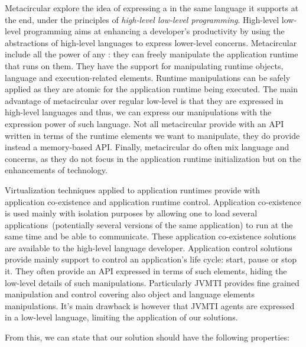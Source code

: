 Metacircular \VMs explore the idea of expressing a \VM in the same language it supports at the end, under the principles of \emph{high-level low-level programming}. High-level low-level programming aims at enhancing a developer's productivity by using the abstractions of high-level languages to express lower-level concerns. Metacircular \VMs include all the power of any \VM: they can freely manipulate the application runtime that runs on them. They have the support for manipulating runtime objects, language and execution-related elements. Runtime manipulations can be safely applied as they are atomic for the application runtime being executed. The main advantage of metacircular \VMs over regular low-level \VMs is that they are expressed in high-level languages and thus, we can express our manipulations with the expression power of such language. Not all metacircular \VMs provide with an API written in terms of the runtime elements we want to manipulate, they do provide instead a memory-based API. Finally, metacircular \VMs do often mix language and \VM concerns, as they do not focus in the application runtime initialization but on the enhancements of \VM technology.

Virtualization techniques applied to application runtimes provide with application co-existence and application runtime control. Application co-existence is used mainly with isolation purposes by allowing one to load several applications~(potentially several versions of the same application) to run at the same time and be able to communicate. These application co-existence solutions are available to the high-level language developer. Application control solutions provide mainly support to control an application's life cycle: start, pause or stop it. They often provide an API expressed in terms of such elements, hiding the low-level details of such manipulations. Particularly JVMTI provides fine grained manipulation and control covering also object and language elements manipulations. It's main drawback is however that JVMTI agents are expressed in a low-level language, limiting the application of our solutions.

From this, we can state that our solution should have the following properties:

